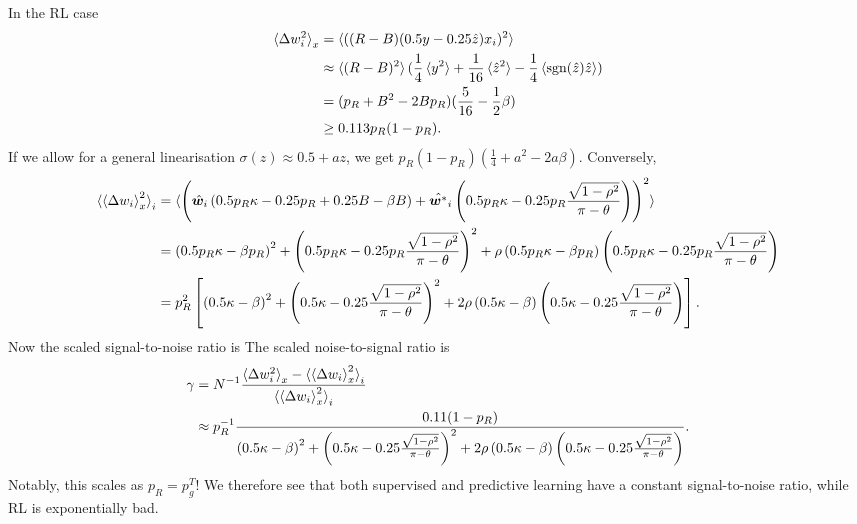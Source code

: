 \documentclass{article}
\renewcommand\b\bm
\begin{document}
In the RL case
\begin{align}
    \braket{\Delta w_i^2}_{x} &= \braket{((R-B)( 0.5 y - 0.25 \hat{z}) x_i)^2}\\
    &\approx \braket{(R-B)^2} (\frac{1}{4} \braket{y^2} + \frac{1}{16} \braket{\hat{z}^2} - \frac{1}{4} \braket{\text{sgn}(\hat{z}) \hat{z}})\\
    &= (p_R + B^2 - 2Bp_R)(\frac{5}{16} - \frac{1}{2}\beta)\\
    &\geq 0.113 p_R(1-p_R).
\end{align}
If we allow for a general linearisation $\sigma(z) \approx 0.5 + a z$, we get $p_R (1- p_R) (\frac{1}{4} + a^2 - 2 a \beta)$.
Conversely, 
\begin{align}
    \braket{\braket{\Delta w_i}_x^2}_i &= \braket{ \left ( \hat{\b{w}}_i \left ( 0.5 p_R \kappa - 0.25 p_R  + 0.25 B - \beta B \right ) + \hat{\b{w}^*}_i \left ( 0.5 p_R \kappa - 0.25 p_R \frac{\sqrt{1-\rho^2} }{\pi - \theta} \right ) \right )^2 }\\
    &= \left ( 0.5 p_R \kappa - \beta p_R \right )^2 + \left ( 0.5 p_R \kappa - 0.25 p_R \frac{\sqrt{1-\rho^2} }{\pi - \theta} \right )^2 + \rho \left ( 0.5 p_R \kappa - \beta p_R \right ) \left ( 0.5 p_R \kappa - 0.25 p_R \frac{\sqrt{1-\rho^2} }{\pi - \theta} \right )\\
    &= p_R^2 \left [ \left ( 0.5 \kappa - \beta \right )^2 + \left ( 0.5 \kappa - 0.25 \frac{\sqrt{1-\rho^2} }{\pi - \theta} \right )^2 + 2 \rho \left ( 0.5 \kappa - \beta \right ) \left ( 0.5 \kappa - 0.25 \frac{\sqrt{1-\rho^2} }{\pi - \theta} \right ) \right ].
\end{align}
Now the scaled signal-to-noise ratio is
The scaled noise-to-signal ratio is
\begin{align}
    \gamma &= N^{-1} \frac{\braket{\Delta w_i^2}_{x} - \braket{\braket{\Delta w_i}_x^2}_i}{\braket{\braket{\Delta w_i}_x^2}_i}\\
    &\approx p_R^{-1} \frac{0.11 (1-p_R)}{\left ( 0.5 \kappa - \beta \right )^2 + \left ( 0.5 \kappa - 0.25 \frac{\sqrt{1-\rho^2} }{\pi - \theta} \right )^2 + 2 \rho \left ( 0.5 \kappa - \beta \right ) \left ( 0.5 \kappa - 0.25 \frac{\sqrt{1-\rho^2} }{\pi - \theta} \right )}.
\end{align}
Notably, this scales as $p_R = p_g^T$!
We therefore see that both supervised and predictive learning have a constant signal-to-noise ratio, while RL is exponentially bad.
\end{document}
